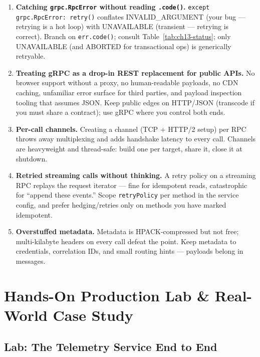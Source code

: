 \begin{enumerate}
        tag and name first (Listing~1), and review \texttt{.proto} diffs like
        schema migrations (Chapter~4).
  \item \textbf{Catching \texttt{grpc.RpcError} without reading
        \texttt{.code()}.} \texttt{except grpc.RpcError: retry()} conflates
        INVALID\_ARGUMENT (your bug --- retrying is a hot loop) with
        UNAVAILABLE (transient --- retrying is correct). Branch on
        \texttt{err.code()}; consult Table~\ref{tab:ch13-status}; only
        UNAVAILABLE (and ABORTED for transactional ops) is generically
        retryable.
  \item \textbf{Treating gRPC as a drop-in REST replacement for public APIs.}
        No browser support without a proxy, no human-readable payloads, no CDN
        caching, unfamiliar error surface for third parties, and payload
        inspection tooling that assumes JSON. Keep public edges on HTTP/JSON
        (transcode if you must share a contract); use gRPC where you control
        both ends.
  \item \textbf{Per-call channels.} Creating a channel (TCP + HTTP/2 setup)
        per RPC throws away multiplexing and adds handshake latency to every
        call. Channels are heavyweight and thread-safe: build one per target,
        share it, close it at shutdown.
  \item \textbf{Retried streaming calls without thinking.} A retry policy on a
        streaming RPC replays the request iterator --- fine for idempotent
        reads, catastrophic for ``append these events.'' Scope
        \texttt{retryPolicy} per method in the service config, and prefer
        hedging/retries only on methods you have marked idempotent.
  \item \textbf{Overstuffed metadata.} Metadata is HPACK-compressed but not
        free; multi-kilabyte headers on every call defeat the point. Keep
        metadata to credentials, correlation IDs, and small routing hints ---
        payloads belong in messages.
\end{enumerate}

\section{Hands-On Production Lab \& Real-World Case Study}
\label{sec:ch13-lab}

\subsection{Lab: The Telemetry Service End to End}

